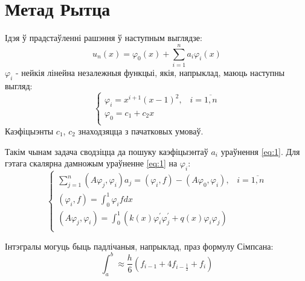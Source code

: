 \section{Метад Рытца}
Ідэя ў прадстаўленні рашэння ў наступным выглядзе:
\begin{equation} \label{eq:1}
    u_n(x) = \varphi_0(x) + \sum_{i=1}^n a_{i}\varphi_{i}(x)
\end{equation}
$\varphi_{i}$ - нейкія лінейна незалежныя функцыі, якія, напрыклад, маюць наступны выгляд:
\begin{equation}
    \begin{cases}
        \varphi_i = x^{i+1}(x-1)^2, \hspace{10pt} i = \overline{1,n} \\
        \varphi_0 = c_1 + c_{2}x \\
    \end{cases}
\end{equation}
Каэфіцыэнты $c_{1}$, $c_{2}$ знаходзяцца з пачатковых умоваў.

Такім чынам задача сводзіцца да пошуку каэфіцыэнтаў $a_{i}$ ураўнення \ref{eq:1}. Для гэтага скалярна дамножым ураўненне \ref{eq:1} на $\varphi_i$:
\begin{equation}
    \begin{cases}
        \sum_{j=1}^n(A\varphi_j, \varphi_i)a_j = (\varphi_i, f) - (A\varphi_0, \varphi_i), \hspace{10pt} i = \overline{1,n} \\
        (\varphi_i, f) = \int_0^1\varphi_i f dx \\
        (A\varphi_j, \varphi_i) = \int_0^1(k(x)\varphi_i^{\prime}\varphi_j^{\prime} + q(x)\varphi_i\varphi_j) \\
    \end{cases}
\end{equation}

Інтэгралы могуць быць падлічаныя, напрыклад, праз формулу Сімпсана:
\begin{equation}
    \int_a^b \approx \frac{h}{6}(f_{i-1} + 4f_{i-\frac{1}{2}} + f_i)
\end{equation}

